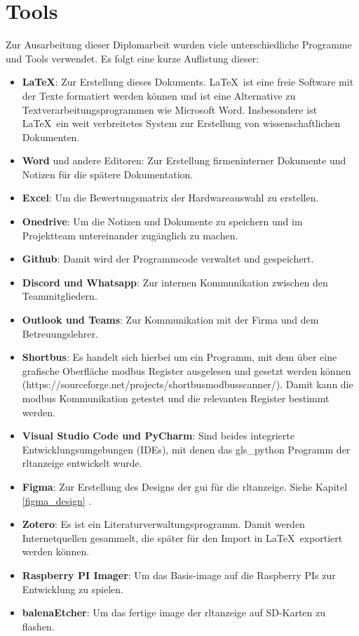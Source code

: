\ifoot{\leftmark}
\chapter{Tools}
\noindent Zur Ausarbeitung dieser Diplomarbeit wurden viele unterschiedliche Programme und Tools verwendet. Es folgt eine kurze Auflistung dieser:
\begin{itemize}
	\item \textbf{\LaTeX}: Zur Erstellung dieses Dokuments. \LaTeX \ ist eine freie Software mit der Texte formatiert werden können und ist eine Alternative zu Textverarbeitungsprogrammen wie Microsoft Word. Insbesondere ist \LaTeX \ ein weit verbreitetes System zur Erstellung von wissenschaftlichen Dokumenten. \cite[vgl.][]{latex_o.J.}
	\item \textbf{Word} und andere Editoren: Zur Erstellung firmeninterner Dokumente und Notizen für die spätere Dokumentation.
	\item \textbf{Excel}: Um die Bewertungsmatrix der Hardwareauswahl zu erstellen.
	\item \textbf{Onedrive}: Um die Notizen und Dokumente zu speichern und im Projektteam untereinander zugänglich zu machen.
	\item \textbf{Github}: Damit wird der Programmcode verwaltet und gespeichert.
	\item \textbf{Discord und Whatsapp}: Zur internen Kommunikation zwischen den Teammitgliedern.
	\item \textbf{Outlook und Teams}: Zur Kommunikation mit der Firma und dem Betreuungslehrer.
	\item \textbf{Shortbus}: Es handelt sich hierbei um ein Programm, mit dem über eine grafische Oberfläche \gls{modbus} Register ausgelesen und gesetzt werden können (https://sourceforge.net/projects/shortbusmodbusscanner/). Damit kann die \gls{modbus} Kommunikation getestet und die relevanten Register bestimmt werden.
	\item \textbf{Visual Studio Code und PyCharm}: Sind beides integrierte Entwicklungsumgebungen (IDEs), mit denen das \gls{gls_python} Programm der \ac{rltanzeige} entwickelt wurde.
	\item \textbf{Figma}: Zur Erstellung des Designs \bzw der \ac{gui} für die \ac{rltanzeige}. Siehe Kapitel \ref{figma_design} .
	\item \textbf{Zotero}: Es ist ein Literaturverwaltungsprogramm. Damit werden Internetquellen gesammelt, die später für den Import in \LaTeX \ exportiert werden können.
    \item \textbf{Raspberry PI Imager}: Um das Basis-\gls{image} auf die Raspberry PIs zur Entwicklung zu spielen.
    \item \textbf{balenaEtcher}: Um das fertige \gls{image} der \ac{rltanzeige} auf SD-Karten zu flashen.
\end{itemize}
